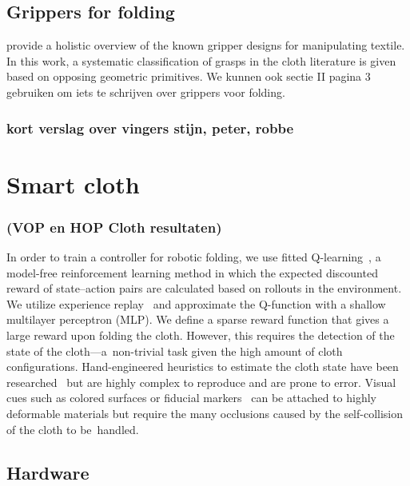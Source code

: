 \documentclass[\home/main.tex]{subfiles}
\begin{document}
\subsection{Grippers for folding}
\autocite{Borras2020} provide a holistic overview of the known gripper designs for manipulating textile. In this work, a systematic classification of grasps in the cloth literature is given based on opposing geometric primitives. 
 We kunnen ook sectie II pagina 3 gebruiken om iets te schrijven over grippers voor folding. 

\subsubsection{kort verslag over vingers stijn, peter, robbe}


\section{Smart cloth}
\subsubsection{(VOP en HOP Cloth resultaten)}


In order to train a controller for robotic folding, we use fitted Q-learning~\cite{Watkins1992}, a model-free reinforcement learning method in which the expected discounted reward of state--action pairs are calculated based on rollouts in the environment. We utilize experience replay~\cite{Lin1992} and approximate the Q-function with a shallow multilayer perceptron (MLP). We define a sparse reward function that gives a large reward upon folding the cloth. However, this requires the detection of the state of the cloth---a~non-trivial task given the high amount of cloth configurations. Hand-engineered heuristics to estimate the cloth state have been researched~\cite{Doumanoglou2016} but are highly complex to reproduce and are prone to error. Visual cues such as colored surfaces or fiducial markers~\cite{Bersch2011, Tsurumine2019} can be attached to highly deformable materials but require the many occlusions caused by the self-collision of the cloth to be~handled.

\subsection{Hardware} 
\end{document}
